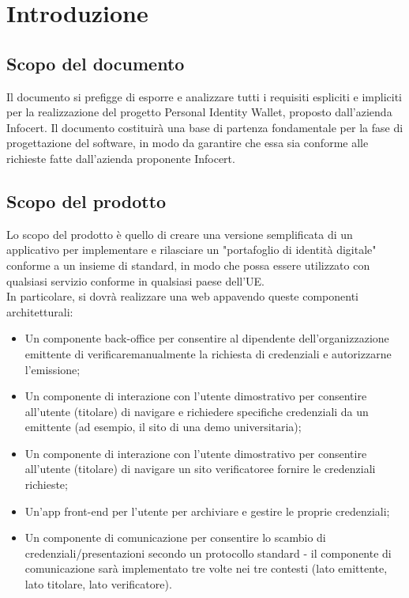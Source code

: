 \section{Introduzione}

\subsection{Scopo del documento}
Il documento si prefigge di esporre e analizzare tutti i requisiti espliciti e impliciti per la realizzazione del progetto Personal Identity Wallet\glo, proposto dall'azienda Infocert. 
Il documento costituirà una base di partenza fondamentale per la fase di progettazione del software, in modo da garantire che essa sia conforme alle richieste fatte dall'azienda 
proponente Infocert.


\subsection{Scopo del prodotto}
Lo scopo del prodotto è quello di creare una versione semplificata di un applicativo per implementare e rilasciare un "portafoglio di identità digitale" conforme a un insieme di 
standard, in modo che possa essere utilizzato con qualsiasi servizio conforme in qualsiasi paese dell'UE. \\
In particolare, si dovrà realizzare una web app\glo avendo queste componenti architetturali:
\begin{itemize}
    \item Un componente back-office per consentire al dipendente dell'organizzazione emittente di verificare\glo manualmente la richiesta di credenziali e autorizzarne l'emissione; 
    \item Un componente di interazione con l'utente dimostrativo per consentire all'utente (titolare) di navigare e richiedere specifiche credenziali da un emittente 
(ad esempio, il sito di una demo universitaria); 
    \item Un componente di interazione con l'utente dimostrativo per consentire all'utente (titolare) di navigare un sito verificatore\glo e fornire le credenziali richieste;
    \item Un'app front-end per l'utente per archiviare e gestire le proprie credenziali; 
    \item Un componente di comunicazione per consentire lo scambio di credenziali/presentazioni secondo un protocollo standard - il componente di comunicazione sarà implementato 
tre volte nei tre contesti (lato emittente, lato titolare, lato verificatore).
\end{itemize}


